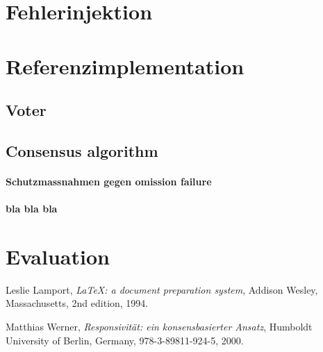 \documentclass[
    12pt,
    bibliography=totoc,
    ngerman
]{scrartcl}
\begin{document}
\clearpage
\section{Fehlerinjektion}

\clearpage
\section{Referenzimplementation}
\subsection{Voter}
\subsection{Consensus algorithm}
\paragraph{Schutzmassnahmen gegen omission failure}
\paragraph{bla bla bla}


\clearpage
\section{Evaluation}


\clearpage
\begin{thebibliography}{9}

  Leslie Lamport,
  \emph{\LaTeX: a document preparation system},
  Addison Wesley, Massachusetts,
  2nd edition,
  1994.
  
  Matthias Werner,
  \emph{Responsivit{\"{a}}t: ein konsensbasierter Ansatz},
  Humboldt University of Berlin, Germany,
  978-3-89811-924-5,
  2000.
   
\end{thebibliography}
\end{document}
